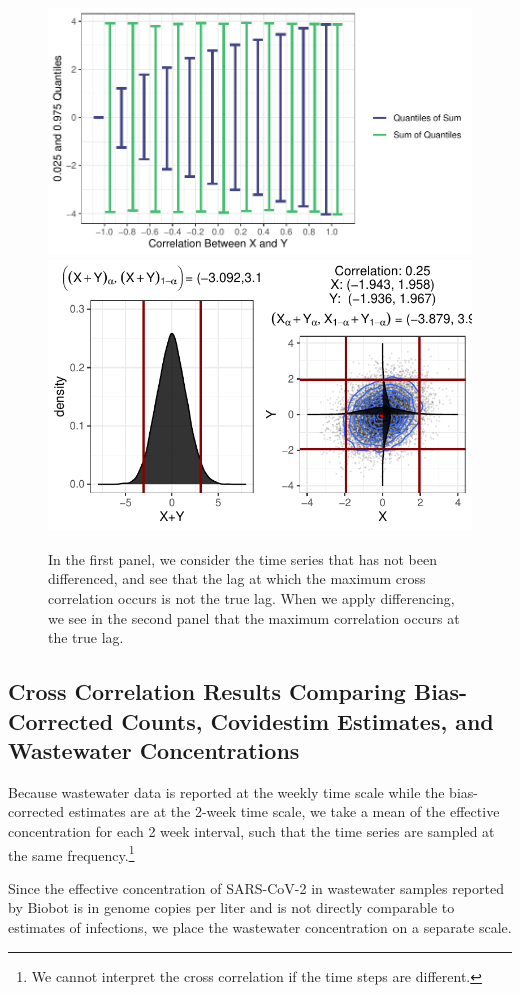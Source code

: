 \documentclass[12pt,twoside]{smiththesis}
\begin{document}
\begin{figure}
\includegraphics[width=0.5\linewidth]{thesis_files/figure-latex/unnamed-chunk-87-1} \includegraphics[width=0.5\linewidth]{thesis_files/figure-latex/unnamed-chunk-87-2} \caption{\label{fig:corzy}In the first panel, we consider the time series that has not been differenced, and see that the lag at which the maximum cross correlation occurs is not the true lag. When we apply differencing, we see in the second panel that the maximum correlation occurs at the true lag.}\label{fig:unnamed-chunk-87}
\end{figure}
\hypertarget{cross-correlation-results-comparing-bias-corrected-counts-covidestim-estimates-and-wastewater-concentrations}{%
\subsection{Cross Correlation Results Comparing Bias-Corrected Counts, Covidestim Estimates, and Wastewater Concentrations}\label{cross-correlation-results-comparing-bias-corrected-counts-covidestim-estimates-and-wastewater-concentrations}}

Because wastewater data is reported at the weekly time scale while the bias-corrected estimates are at the 2-week time scale, we take a mean of the effective concentration for each 2 week interval, such that the time series are sampled at the same frequency.\footnote{We cannot interpret the cross correlation if the time steps are different.}

Since the effective concentration of SARS-CoV-2 in wastewater samples reported by Biobot is in genome copies per liter and is not directly comparable to estimates of infections, we place the wastewater concentration on a separate scale.
\end{document}
